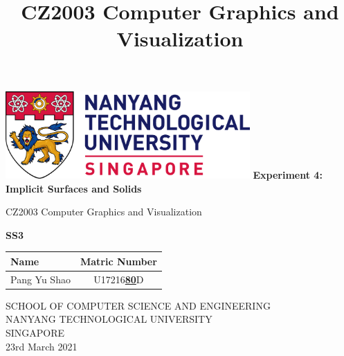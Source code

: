 \documentclass[acmlarge,nonacm=true]{acmart}
\begin{document}
	
	\begin{titlepage}
		\begin{center}
			\vspace*{1cm}
			\includegraphics[width=0.7\textwidth]{fig/ntu_logo}
			\vspace{0.8cm}
			\linebreak
			\Huge
			\textbf{Experiment 4: Implicit Surfaces and Solids}
			
			\vspace{0.5cm}
			\LARGE
			CZ2003 Computer Graphics and Visualization
			
			\vspace{1.5cm}
			\textbf{SS3}\\
			
			\begin{table}[h]
				\begin{tabular}{lc}
					Name & Matric Number \\\hline
					Pang Yu Shao & U17216\underline{\textbf{80}}D \\
				\end{tabular}
			\end{table}
			
			
			
			\vfill
			
			\vspace{0.8cm}
			
			
			
			\Large
			SCHOOL OF COMPUTER SCIENCE AND ENGINEERING\\
			NANYANG TECHNOLOGICAL UNIVERSITY\\
			SINGAPORE\\
			23rd March 2021
			
		\end{center}
	\end{titlepage}

 

\title{CZ2003 Computer Graphics and Visualization}

\end{document}
